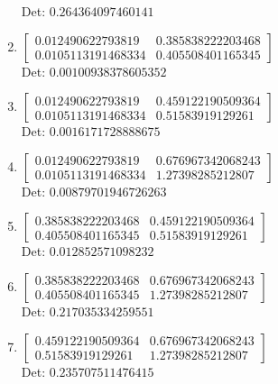 \documentclass[12pt]{article}
\begin{document}
\begin{enumerate}
Det: $0.264364097460141$\\

\item $\displaystyle \left[\begin{matrix}0.012490622793819 & 0.385838222203468\\0.0105113191468334 & 0.405508401165345\end{matrix}\right]$\\

Det: $0.00100938378605352$\\

\item $\displaystyle \left[\begin{matrix}0.012490622793819 & 0.459122190509364\\0.0105113191468334 & 0.51583919129261\end{matrix}\right]$\\

Det: $0.0016171728888675$\\

\item $\displaystyle \left[\begin{matrix}0.012490622793819 & 0.676967342068243\\0.0105113191468334 & 1.27398285212807\end{matrix}\right]$\\

Det: $0.00879701946726263$\\

\item $\displaystyle \left[\begin{matrix}0.385838222203468 & 0.459122190509364\\0.405508401165345 & 0.51583919129261\end{matrix}\right]$\\

Det: $0.012852571098232$\\

\item $\displaystyle \left[\begin{matrix}0.385838222203468 & 0.676967342068243\\0.405508401165345 & 1.27398285212807\end{matrix}\right]$\\

Det: $0.217035334259551$\\

\item $\displaystyle \left[\begin{matrix}0.459122190509364 & 0.676967342068243\\0.51583919129261 & 1.27398285212807\end{matrix}\right]$\\

Det: $0.235707511476415$\\

\end{enumerate}
\end{document}
